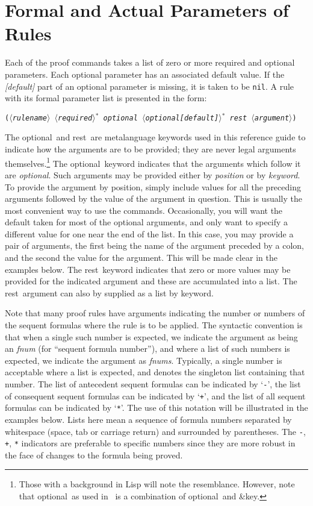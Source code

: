 \documentclass[12pt,twoside]{book}
\def\optl{{\smaller\sc {\smaller\smaller \&}optional}}
\def\rest{{\smaller\sc {\smaller\smaller \&}rest}}
\def\bkt#1{{$\langle$#1$\rangle$}}
\begin{document}
\section{Formal and Actual Parameters of Rules}
Each of the proof commands takes a list of zero or more required and
optional parameters.  Each optional parameter has an associated default
value.  If the  \emph{[default]} part of an optional parameter is
missing, it is taken to be \texttt{nil}.  A rule with its formal parameter
list is presented in the form:
\begin{center}
  \texttt{(\emph{\bkt{rulename} \bkt{required}$^{\textstyle *}$
        \optl\ \bkt{optional[default]}$^{\textstyle *}$
        \rest\ \bkt{argument}})}
\end{center}
The \optl\ and \rest\ are metalanguage keywords used in this reference
guide to indicate how the arguments are to 
be provided; they are never legal arguments themselves.\footnote{Those
with a background in Lisp will note the resemblance.  However, note that
\optl\ as used in \pvs\ is a combination of \optl\ and {{\smaller\sc
{\smaller\smaller \&}key}}.} The \optl\ keyword indicates that the
arguments which follow it are \emph{optional}.  Such arguments may be
provided either by \emph{position} or by \emph{keyword}.  To provide
the argument by position, simply include values for all the preceding
arguments followed by the value of the argument in question.  This is
usually the most convenient way to use the commands.  Occasionally, you
will want the default taken for most of the optional arguments, and only
want to specify a different value for one near the end of the list.  In
this case, you may provide a pair of arguments, the first being the name
of the argument preceded by a colon, and the second the value for the
argument.  This will be made clear in the examples below.  The \rest\
keyword indicates that zero or more values may be provided for the
indicated argument and these are accumulated into a list.  The \rest\
argument can also by supplied as a list by keyword.  

Note that many proof rules have arguments indicating the number or
numbers of the sequent formulas where the rule is to be applied.  The
syntactic convention is that when a single such number is expected, we
indicate the argument as being an \emph{fnum} (for ``sequent formula
number''), and where a list of such numbers is expected, we indicate the
argument as \emph{fnums}.  Typically, a single number is acceptable
where a list is expected, and denotes the singleton list containing that
number.  The list of antecedent sequent formulas can be indicated by
`\texttt{-}', the list of consequent sequent formulas can be indicated by
`\texttt{+}', and the list of all sequent formulas can be indicated by
`\texttt{*}'.  The use of this notation will be illustrated in the
examples below.  Lists here mean a sequence of formula numbers separated
by whitespace (space, tab or carriage return) and surrounded by
parentheses.  The \texttt{-}, \texttt{+}, \texttt{*} indicators are preferable to
specific numbers since they are more robust in the face of changes to the
formula being proved.
\end{document}
